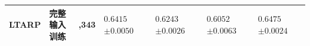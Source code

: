 \begin{table}[!htbp]
\begin{tabularx}{\textwidth}{@{}>{\raggedright\arraybackslash}p{2.0cm}>{\centering\arraybackslash}p{2.5cm}>{\centering\arraybackslash}p{2.1cm}*{4}{>{\centering\arraybackslash}X}@{}}
\addlinespace\midrule
LTARP & \shortstack{完整输入\\训练} & 164,343 & \shortstack{$0.6415$\\$\pm0.0050$} & \shortstack{$0.6243$\\$\pm0.0026$} & \shortstack{$0.6052$\\$\pm0.0063$} & \shortstack{$0.6475$\\$\pm0.0024$}\\
\bottomrule
\end{tabularx}
\end{table}